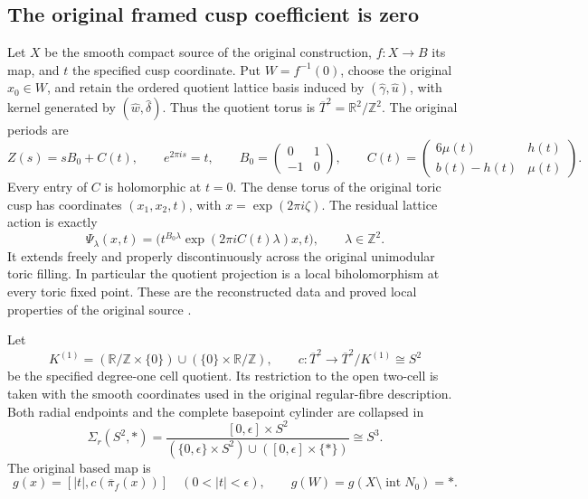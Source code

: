 \documentclass[11pt]{article}
\theoremstyle{definition}
\newcommand{\R}{\mathbb R}
\newcommand{\Z}{\mathbb Z}
\begin{document}
\subsection{The original framed cusp coefficient is zero}
Let \(X\) be the smooth compact source of the original construction,
\(f:X\to B\) its map, and \(t\) the specified cusp coordinate.
Put \(W=f^{-1}(0)\), choose the original \(x_0\in W\), and retain the
ordered quotient lattice basis induced by
\((\widehat\gamma,\widehat u)\), with kernel generated by
\((\widehat w,\widehat\delta)\). Thus the quotient torus is
\(\overline T^2=\R^2/\Z^2\). The original periods are
\begin{equation}
 Z(s)=sB_0+C(t),\qquad e^{2\pi i s}=t,\qquad
 B_0=\begin{pmatrix}0&1\\-1&0\end{pmatrix},\qquad
 C(t)=\begin{pmatrix}6\mu(t)&h(t)\\b(t)-h(t)&\mu(t)\end{pmatrix}.
 \label{gzero:eq:periods}
\end{equation}
Every entry of \(C\) is holomorphic at \(t=0\).
The dense torus of the original toric cusp has coordinates
\((x_1,x_2,t)\), with
\(x=\exp(2\pi i\zeta)\). The residual lattice action is exactly
\begin{equation}
 \Psi_\lambda(x,t)=
 \bigl(t^{B_0\lambda}\exp(2\pi iC(t)\lambda)x,t\bigr),
 \qquad\lambda\in\Z^2.
 \label{gzero:eq:action}
\end{equation}
It extends freely and properly discontinuously across the original
unimodular toric filling. In particular the quotient projection is a local
biholomorphism at every toric fixed point. These are the reconstructed
data and proved local properties of the original source
\cite[\S4, source pp.~24--29]{AlpogeS6_2026}.

Let
\[
 K^{(1)}=(\R/\Z\times\{0\})\cup(\{0\}\times\R/\Z),\qquad
 c:\overline T^2\longrightarrow \overline T^2/K^{(1)}\cong S^2
\]
be the specified degree-one cell quotient. Its restriction to the open
two-cell is taken with the smooth coordinates used in the original
regular-fibre description. Both radial endpoints and the complete
basepoint cylinder are collapsed in
\[
 \Sigma_r(S^2,*)=
 \frac{[0,\epsilon]\times S^2}
 {(\{0,\epsilon\}\times S^2)\cup([0,\epsilon]\times\{*\})}
 \cong S^3.
\]
The original based map is
\begin{equation}
 g(x)=[|t|,c(\overline\pi_f(x))]\quad(0<|t|<\epsilon),\qquad
 g(W)=g(X\setminus\operatorname{int}N_0)=*.
 \label{gzero:eq:g}
\end{equation}
\end{document}

